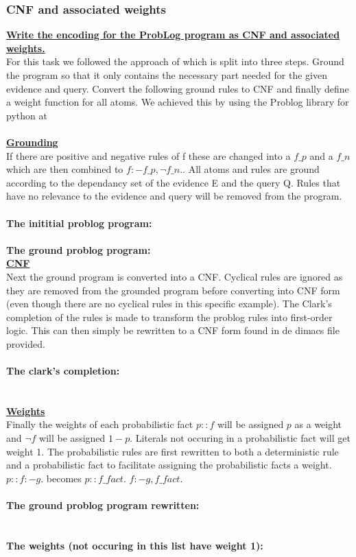 \documentclass{article}
\begin{document}
\subsubsection{CNF and associated weights}
\underline{\textbf{Write the encoding for the ProbLog program as CNF and associated weights.}}
\\
For this task we followed the approach of \cite{Fierens} which is split into three steps. Ground the program so that it only contains the necessary part needed for the given evidence and query. Convert the following ground rules to CNF and finally define a weight function for all atoms. We achieved this by using the Problog library for python at %
\\\\
\underline{\textbf{Grounding}}
\\
If there are positive and negative rules of f these are changed into a $f\_p$ and a $f\_n$ which are then combined to $f :- f\_p,  \neg f\_n.$. All atoms and rules are ground according to the dependancy set of the evidence E and the query Q. Rules that have no relevance to the evidence and query will be removed from the program. 
\\\\
\textbf{The inititial problog program:}
\\

\\
\textbf{The ground problog program:}
\\

\underline{\textbf{CNF}}
\\
Next the ground program is converted into a CNF. Cyclical rules are ignored as they are removed from the grounded program before converting into CNF form (even though there are no cyclical rules in this specific example). The Clark's completion of the rules is made to transform the problog rules into first-order logic. This can then simply be rewritten to a CNF form found in de dimacs file provided.
\\\\
\textbf{The clark's completion:}
\\

\\\\
\underline{\textbf{Weights}}
\\
Finally the weights of each probabilistic fact $p::f$ will be assigned $p$ as a weight and $\neg f$ will be assigned $1-p$. Literals not occuring in a probabilistic fact will get weight 1. The probabilistic rules are first rewritten to both a deterministic rule and a probabilistic fact to facilitate assigning the probabilistic facts a weight. $p :: f :- g.$ becomes $p :: f\_fact.$ $f :- g, f\_fact.$
\\\\
\textbf{The ground problog program rewritten:}
\\

\\\\
\textbf{The weights (not occuring in this list have weight 1):}
\\

\end{document}
